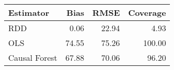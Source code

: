 \begin{table}[ht]
\centering
\begin{tabular}{lrrr}
  \hline
Estimator & Bias & RMSE & Coverage \\ 
  \hline
RDD & 0.06 & 22.94 & 4.93 \\ 
  OLS & 74.55 & 75.26 & 100.00 \\ 
  Causal Forest & 67.88 & 70.06 & 96.20 \\ 
   \hline
\end{tabular}
\end{table}
